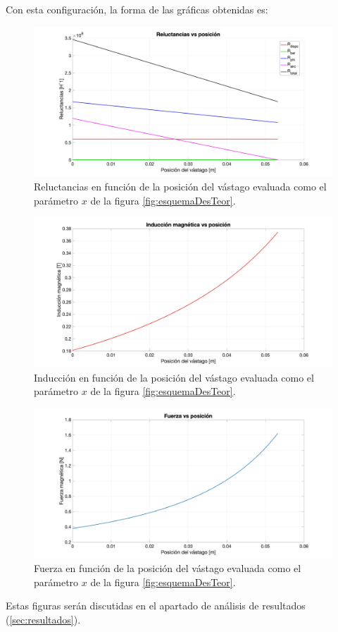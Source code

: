 Con esta configuración, la forma de las gráficas obtenidas es:

\begin{figure}[H]
    \centering
    \includegraphics[width=\linewidth]{FigurasMemoria/calcRsetupBase.jpg}
    \caption{Reluctancias en función de la posición del vástago evaluada como el parámetro \(x\) de la figura \ref{fig:esquemaDesTeor}.}
    \label{fig:calcRsetupBase} %
\end{figure}

\begin{figure}[H]
    \centering
    \includegraphics[width=\linewidth]{FigurasMemoria/calcBsetupBase.jpg}
    \caption{Inducción en función de la posición del vástago evaluada como el parámetro \(x\) de la figura \ref{fig:esquemaDesTeor}.}
    \label{fig:calcBsetupBase} %
\end{figure}

\begin{figure}[H]
    \centering
    \includegraphics[width=\linewidth]{FigurasMemoria/calcFsetupBase.jpg}
    \caption{Fuerza en función de la posición del vástago evaluada como el parámetro \(x\) de la figura \ref{fig:esquemaDesTeor}.}
    \label{fig:calcFsetupBase} %
\end{figure}

\noindent Estas figuras serán discutidas en el apartado de análisis de resultados (\ref{sec:resultados}).